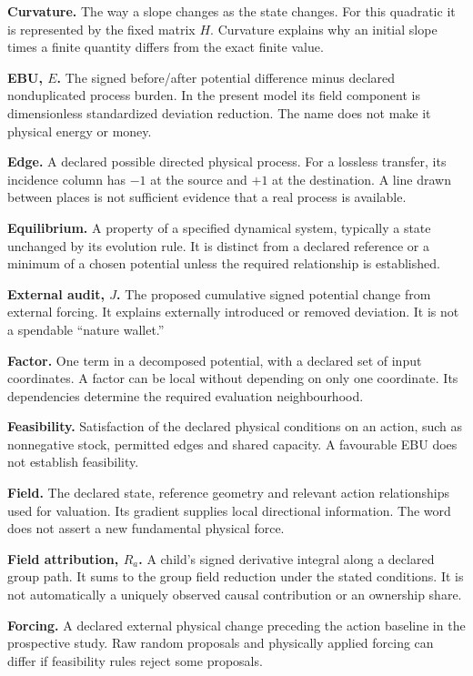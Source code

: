 \textbf{Curvature.} The way a slope changes as the state changes. For this quadratic it is represented by the fixed matrix $H$. Curvature explains why an initial slope times a finite quantity differs from the exact finite value.

\textbf{EBU, $E$.} The signed before/after potential difference minus declared nonduplicated process burden. In the present model its field component is dimensionless standardized deviation reduction. The name does not make it physical energy or money.

\textbf{Edge.} A declared possible directed physical process. For a lossless transfer, its incidence column has $-1$ at the source and $+1$ at the destination. A line drawn between places is not sufficient evidence that a real process is available.

\textbf{Equilibrium.} A property of a specified dynamical system, typically a state unchanged by its evolution rule. It is distinct from a declared reference or a minimum of a chosen potential unless the required relationship is established.

\textbf{External audit, $J$.} The proposed cumulative signed potential change from external forcing. It explains externally introduced or removed deviation. It is not a spendable ``nature wallet.''

\textbf{Factor.} One term in a decomposed potential, with a declared set of input coordinates. A factor can be local without depending on only one coordinate. Its dependencies determine the required evaluation neighbourhood.

\textbf{Feasibility.} Satisfaction of the declared physical conditions on an action, such as nonnegative stock, permitted edges and shared capacity. A favourable EBU does not establish feasibility.

\textbf{Field.} The declared state, reference geometry and relevant action relationships used for valuation. Its gradient supplies local directional information. The word does not assert a new fundamental physical force.

\textbf{Field attribution, $R_a$.} A child's signed derivative integral along a declared group path. It sums to the group field reduction under the stated conditions. It is not automatically a uniquely observed causal contribution or an ownership share.

\textbf{Forcing.} A declared external physical change preceding the action baseline in the prospective study. Raw random proposals and physically applied forcing can differ if feasibility rules reject some proposals.

